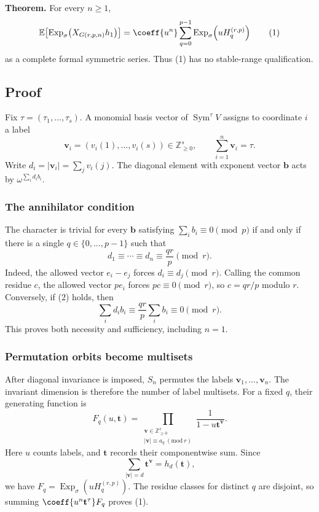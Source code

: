\documentclass[10pt]{article}
\newcommand{\Sym}{\operatorname{Sym}}
\newcommand{\ExpS}{\operatorname{Exp}_{\sigma}}
\newcommand{\smg}[1]{\mathbb E\!\left[\ExpS\!\left(X_{#1}h_1\right)\right]}
\begin{document}
\textbf{Theorem.}
For every $n\geq1$,
\[
\smg{G(r,p,n)}=\coeff{u^n}\sum_{q=0}^{p-1}
\ExpS\!\left(uH_q^{(r,p)}\right)
\tag{1}
\]
as a complete formal symmetric series.  Thus (1) has no stable-range
qualification.

\subsection{Proof}

Fix $\tau=(\tau_1,\ldots,\tau_s)$.  A monomial basis vector of
$\Sym^\tau V$ assigns to coordinate $i$ a label
\[
\mathbf v_i=(v_i(1),\ldots,v_i(s))\in\mathbb Z_{\geq0}^s,
\qquad \sum_{i=1}^n\mathbf v_i=\tau.
\]
Write $d_i=|\mathbf v_i|=\sum_jv_i(j)$.  The diagonal element with exponent
vector $\mathbf b$ acts by $\omega^{\sum_i d_i b_i}$.

\subsubsection*{The annihilator condition}

The character is trivial for every $\mathbf b$ satisfying
$\sum_i b_i\equiv0\pmod p$ if and only if there is a single
$q\in\{0,\ldots,p-1\}$ such that
\[
d_1\equiv\cdots\equiv d_n\equiv\frac{qr}{p}\pmod r.
\tag{2}
\]
Indeed, the allowed vector $e_i-e_j$ forces $d_i\equiv d_j\pmod r$.
Calling the common residue $c$, the allowed vector $p e_i$ forces
$pc\equiv0\pmod r$, so $c=qr/p$ modulo $r$.  Conversely, if (2) holds, then
\[
\sum_i d_i b_i\equiv\frac{qr}{p}\sum_i b_i\equiv0\pmod r.
\]
This proves both necessity and sufficiency, including $n=1$.

\subsubsection*{Permutation orbits become multisets}

After diagonal invariance is imposed, $S_n$ permutes the labels
$\mathbf v_1,\ldots,\mathbf v_n$.  The invariant dimension is therefore the
number of label multisets.  For a fixed $q$, their generating function is
\[
F_q(u,\mathbf t)=
\prod_{\substack{\mathbf v\in\mathbb Z_{\geq0}^s\\
|\mathbf v|\equiv a_q\ (\mathrm{mod}\ r)}}
\frac1{1-u\mathbf t^{\mathbf v}}.
\]
Here $u$ counts labels, and $\mathbf t$ records their componentwise sum.  Since
\[
\sum_{|\mathbf v|=d}\mathbf t^{\mathbf v}=h_d(\mathbf t),
\]
we have $F_q=\ExpS(uH_q^{(r,p)})$.  The residue classes for distinct $q$ are
disjoint, so summing $\coeff{u^n\mathbf t^\tau}F_q$ proves (1).
\end{document}
